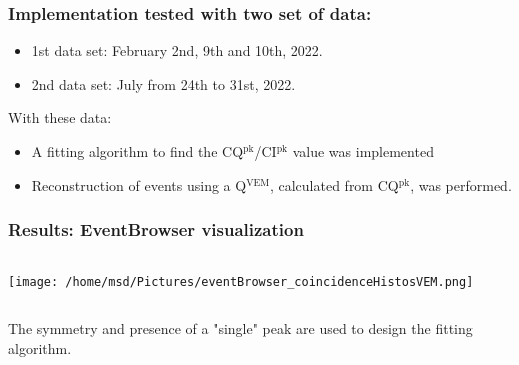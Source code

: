\documentclass[aspectratio=169]{beamer}
\begin{document}
\begin{frame}
  \frametitle{Implementation tested with two set of data:}

  \begin{itemize}
    \item<1-> 1st data set: February 2nd, 9th and 10th, 2022.
    \item<1-> 2nd data set: July from 24th to 31st, 2022.
  \end{itemize}
  \vspace{0.5cm}

  With these data:
  \begin{itemize}
    \item<2-> A fitting algorithm to find the
      CQ$^{\mathrm{pk}}$/CI$^{\mathrm{pk}}$ value was implemented
    \item<2-> Reconstruction of events using a 
      Q$^{\mathrm{VEM}}$, calculated from CQ$^{\mathrm{pk}}$, was
      performed.
  \end{itemize}
      
\end{frame}

\begin{frame}
  \frametitle{Results: EventBrowser visualization}
  \vspace{0.2cm}

  \begin{columns}
    \centering
    \begin{column}{.75\textwidth}
      \texttt{[image: /home/msd/Pictures/eventBrowser\_coincidenceHistosVEM.png]}
    \end{column}
  \end{columns}
  \vspace{0.5cm}

  The symmetry and presence of a "single" peak are used to
  design the fitting algorithm.
\end{frame}
\end{document}
